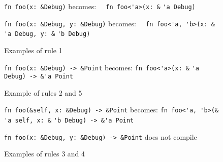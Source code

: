 \begin{figure}
{\verb|fn foo(x: &Debug)|}\newline
becomes:\newline
{\verb|  fn foo<'a>(x: &|}
{\color{red} \verb|'a|}{\verb| Debug)|}

\vspace{4mm}

{\verb|fn foo(x: &Debug, y: &Debug)|}\newline
becomes:\newline
{\verb|  fn foo<'a, 'b>(x: &|}
{\color{red} \verb|'a|}{\verb| Debug, y: &|}{\color{red} \verb|'b|}{\verb| Debug)|}

\caption{Examples of rule 1}
\label{Fig:lifetimes2}
\end{figure}

\begin{figure}
{\verb|fn foo(x: &Debug) -> &Point|}\newline
becomes:
{\verb|fn foo<'a>(x: &|}
{\color{red} \verb|'a|}{\verb| Debug) -> &|}{\color{blue}\verb|'a|}{\verb| Point|}

\vspace{4mm}

\caption{Example of rules 2 and 5}
\label{Fig:lifetimes3}
\end{figure}

\begin{figure}
{\verb|fn foo(&self, x: &Debug) -> &Point|}\newline
becomes:\newline
{\verb|fn foo<'a, 'b>(&|}
{\color{green} \verb|'a|}{\verb| self, x: &|}{\color{red} \verb|'b|}{\verb| Debug) -> &|}{\color{blue}\verb|'a|}{\verb| Point|}


\vspace{4mm}
{\verb|fn foo(x: &Debug, y: &Debug) -> &Point|}\newline
does not compile

\caption{Examples of rules 3 and 4}
\label{Fig:lifetimes4}
\end{figure}

